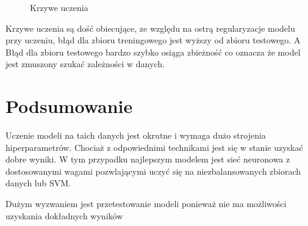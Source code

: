 \documentclass[12pt]{article}
\begin{document}
        \begin{figure}[h!]
            \centering
            \caption{Krzywe uczenia}
            \label{fig:learning_curves_prc}
        \end{figure}
        
        Krzywe uczenia są dość obiecujące, ze względu na ostrą regularyzacje modelu przy uczeniu, błąd dla
        zbioru treningowego jest wyższy od zbioru testowego. A Błąd dla zbioru testowego bardzo szybko osiąga 
        zbieżność co oznacza że model jest zmuszony szukać zależności w danych.

    \section{Podsumowanie}

    Uczenie modeli na taich danych jest okrutne i wymaga dużo strojenia hiperparametrów. Chociaż z odpowiednimi technikami
    jest się w stanie uzyskać dobre wyniki. W tym przypadku najlepszym modelem jest sieć neuronowa z dostosowanymi wagami
    pozwlającymi uczyć się na niezbalansowanych zbiorach danych lub SVM. 

    Dużym wyzwaniem jest przetestowanie modeli ponieważ nie ma możliwości uzyskania dokładnych wyników 
\end{document}
